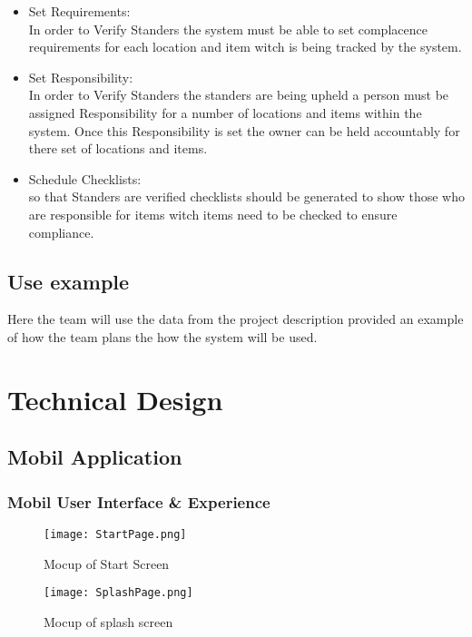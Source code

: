 \documentclass[Letter,11pt]{article}
\begin{document}
		\begin{itemize}
			\item Set Requirements:\\
			In order to Verify Standers the system must be able to set complacence requirements for each location and item witch is being tracked by the system.
			\item Set Responsibility:\\
			In order to Verify Standers the standers are being upheld a person must be assigned Responsibility for a number of locations and items within the system. Once this Responsibility is set the owner can be held accountably for there set of locations and items. 
			\item Schedule Checklists:\\
			so that Standers are verified  checklists should be generated to show those who are responsible for items witch items need to be checked to ensure compliance.
		\end{itemize}
		
	\subsection{Use example}
		Here the team will use the data from the project description provided an example of how the team plans the how the system will be used.
		  
		
\section{Technical Design}
	
	\subsection{Mobil Application}
	\subsubsection{Mobil User Interface \& Experience}
	
	\begin{figure}[h]
		
		\begin{minipage}{0.5\textwidth}
			\centering
			\texttt{[image: StartPage.png]}
			\caption{Mocup of Start Screen}
		\end{minipage}%
		\begin{minipage}{0.5\textwidth}
			\centering
			\texttt{[image: SplashPage.png]}
			\caption{Mocup of splash screen}
		\end{minipage}
	\end{figure}
	
\end{document}
